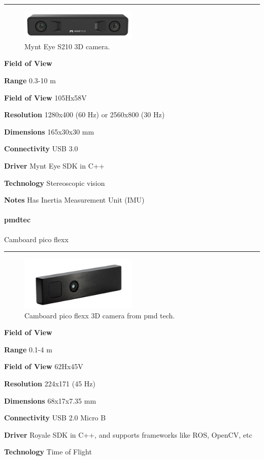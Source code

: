 \documentclass[../main.tex]{subfiles}
\begin{document}
\noindent\rule{8cm}{0.1pt}
\begin{figure}[H]
    \centering
    \includegraphics[width=0.5\textwidth]{images/MinteyeD1000120.png}
    \caption{Mynt Eye S210 3D camera.}
    \label{fig:MinteyeD1000120}
\end{figure}
\begin{labeling}{\textbf{Field of View    }}
    \setlength{\itemindent}{2em}
    \item [\textbf{Range}] 0.3-10 m
    \item [\textbf{Field of View}] 105Hx58V
    \item [\textbf{Resolution}] 1280x400 (60 Hz) or 2560x800 (30 Hz)
    \item [\textbf{Dimensions}] 165x30x30 mm 
    \item [\textbf{Connectivity}] USB 3.0   
    \item [\textbf{Driver}] Mynt Eye SDK in C++
    \item [\textbf{Technology}] Stereoscopic vision
    \item [\textbf{Notes}] Has Inertia Measurement Unit (IMU)
\end{labeling}
\vspace{1em}
\paragraph{\large \textbf{pmdtec}} {\large Camboard pico flexx}

\noindent\rule{8cm}{0.1pt}
\begin{figure}[H]
    \centering
    \includegraphics[width=0.5\textwidth]{images/camboardPicoFlexx.png}
    \caption{Camboard pico flexx 3D camera from pmd tech.}
    \label{fig:camboardPicoFlexx}
\end{figure}
\begin{labeling}{\textbf{Field of View    }}
    \setlength{\itemindent}{2em}
    \item [\textbf{Range}] 0.1-4 m
    \item [\textbf{Field of View}] 62Hx45V
    \item [\textbf{Resolution}] 224x171 (45 Hz)
    \item [\textbf{Dimensions}] 68x17x7.35 mm
    \item [\textbf{Connectivity}] USB 2.0 Micro B 
    \item [\textbf{Driver}] Royale SDK in C++, and supports frameworks like ROS, OpenCV, etc
    \item [\textbf{Technology}] Time of Flight
\end{labeling}
\vspace{1em}
\end{document}
